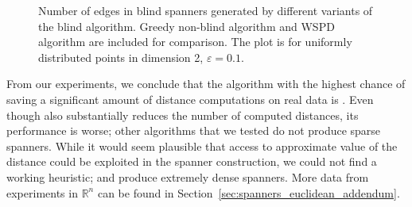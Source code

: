 \documentclass{ws-ijcga}
\newcommand{\eps}{\varepsilon}
\newcommand{\RR}{\mathbb{R}}
\def \expDistDataPath {./}
\begin{document}
\begin{figure}[!htbp]
    \begin{centering}
\end{centering}
    \caption{Number of edges in blind spanners generated by different variants of the blind
    algorithm. Greedy non-blind algorithm and WSPD algorithm are included for comparison. The plot is for uniformly distributed points
    in dimension 2, $\eps = 0.1$.}
    \label{fig:spanner_sparseness}
\end{figure}



From our experiments, we conclude that the algorithm with the highest chance
of saving a significant amount of distance computations on real data is \bgrdy. 
Even though \brndm also substantially reduces
the number of computed distances, its performance is worse;
other algorithms that we tested do not produce sparse spanners.
While it would seem plausible that access to approximate value of the distance
could be exploited in the spanner construction,
we could not find a working heuristic; \bqsgrdy and \bqsshaker produce extremely
dense spanners. More data from experiments in $\RR^n$ can be found in
Section~\ref{sec:spanners_euclidean_addendum}.
\end{document}
